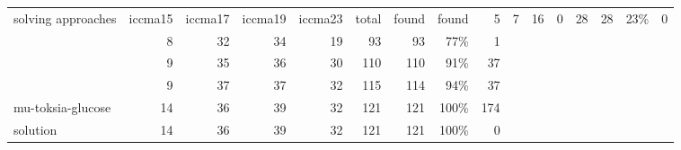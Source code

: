 \begin{tabular}{lrrrrrrrr}
\toprule
solving approaches & iccma15 & iccma17 & iccma19 & iccma23 & total & found & found %
\midrule
{} & 5 & 7 & 16 & 0 & 28 & 28 & 23\% & 0 \\
 & 8 & 32 & 34 & 19 & 93 & 93 & 77\% & 1 \\
 & 9 & 35 & 36 & 30 & 110 & 110 & 91\% & 37 \\
 & 9 & 37 & 37 & 32 & 115 & 114 & 94\% & 37 \\
mu-toksia-glucose & 14 & 36 & 39 & 32 & 121 & 121 & 100\% & 174 \\
\midrule
solution & 14 & 36 & 39 & 32 & 121 & 121 & 100\% & 0 \\
\bottomrule
\end{tabular}

